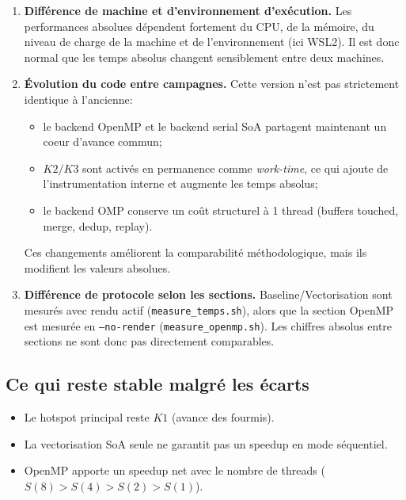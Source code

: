 \begin{enumerate}[leftmargin=*]
  \item \textbf{Différence de machine et d'environnement d'exécution.}
  Les performances absolues dépendent fortement du CPU, de la mémoire, du niveau de charge de la
  machine et de l'environnement (ici WSL2). Il est donc normal que les temps absolus changent
  sensiblement entre deux machines.

  \item \textbf{Évolution du code entre campagnes.}
  Cette version n'est pas strictement identique à l'ancienne:
  \begin{itemize}[leftmargin=*]
    \item le backend OpenMP et le backend serial SoA partagent maintenant un coeur d'avance commun;
    \item \(K2/K3\) sont activés en permanence comme \emph{work-time}, ce qui ajoute de
    l'instrumentation interne et augmente les temps absolus;
    \item le backend OMP conserve un coût structurel à 1 thread (buffers touched, merge, dedup, replay).
  \end{itemize}
  Ces changements améliorent la comparabilité méthodologique, mais ils modifient les valeurs absolues.

  \item \textbf{Différence de protocole selon les sections.}
  Baseline/Vectorisation sont mesurés avec rendu actif (\texttt{measure\_temps.sh}), alors que la
  section OpenMP est mesurée en \texttt{--no-render} (\texttt{measure\_openmp.sh}). Les chiffres
  absolus entre sections ne sont donc pas directement comparables.
\end{enumerate}

\subsection{Ce qui reste stable malgré les écarts}

\begin{itemize}[leftmargin=*]
  \item Le hotspot principal reste \(K1\) (avance des fourmis).
  \item La vectorisation SoA seule ne garantit pas un speedup en mode séquentiel.
  \item OpenMP apporte un speedup net avec le nombre de threads (\(S(8)>S(4)>S(2)>S(1)\)).
\end{itemize}
